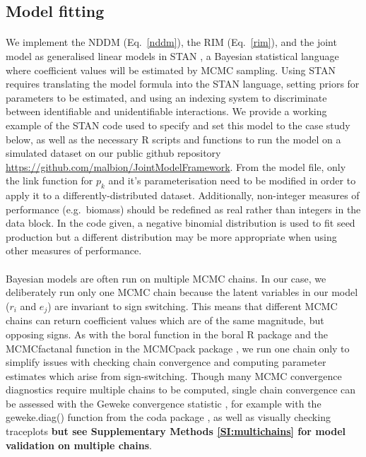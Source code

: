 \documentclass[a4,12pt]{article}
\begin{document}
\begin{refsection}
    \subsection{Model fitting}

        \paragraph{}        
        We implement the NDDM (Eq.~\ref{nddm}), the RIM (Eq.~\ref{rim}), and the joint model as generalised linear models in STAN \parencite{Carpenter2017}, a Bayesian statistical language where coefficient values will be estimated by MCMC sampling. Using STAN requires translating the model formula into the STAN language, setting priors for parameters to be estimated, and using an indexing system to discriminate between identifiable and unidentifiable interactions. We provide a working example of the STAN code used to specify and set this model to the case study below, as well as the necessary R scripts and functions to run the model on a simulated dataset on our public github repository \url{https://github.com/malbion/JointModelFramework}.
        From the model file, only the link function for $p_k$ and it's parameterisation need to be modified in order to apply it to a differently-distributed dataset. Additionally, non-integer measures of performance (e.g.\ biomass) should be redefined as real rather than integers in the data block. In the code given, a negative binomial distribution is used to fit seed production but a different distribution may be more appropriate when using other measures of performance.   

        \paragraph{}
        Bayesian models are often run on multiple MCMC chains. In our case, we deliberately run only one MCMC chain because the latent variables in our model ($r_i$ and $e_j$) are invariant to sign switching. This means that different MCMC chains can return coefficient values which are of the same magnitude, but opposing signs. As with the boral function in the boral R package \parencite{Hui2021} and the MCMCfactanal function in the MCMCpack package \parencite{Martin2011}, we run one chain only to simplify issues with checking chain convergence and computing parameter estimates which arise from sign-switching. Though many MCMC convergence diagnostics require multiple chains to be computed, single chain convergence can be assessed with the Geweke convergence statistic \parencite{Geweke1992}, for example with the geweke.diag() function from the coda package \parencite{Plummer2006}, as well as visually checking traceplots \textbf{but see Supplementary Methods \ref{SI:multichains} for model validation on multiple chains}.


\end{refsection}
\end{document}
